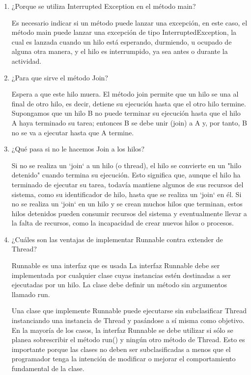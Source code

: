 \documentclass{article}
\begin{document}
\begin{enumerate}
    \item ¿Porque se utiliza Interrupted Exception en el método main?
    
    Es necesario indicar si un método puede lanzar una excepción, en este caso, el método main puede lanzar una excepción de tipo InterruptedException, la cual es lanzada cuando un hilo está esperando, durmiendo, u ocupado de alguna otra manera, y el hilo es interrumpido, ya sea antes o durante la actividad. 

    \item ¿Para que sirve el método Join?
    
    Espera a que este hilo muera. El método join permite que un hilo se una al final de otro hilo, es decir, detiene su ejecución hasta que el otro hilo termine.
    Supongamos que un hilo B no puede terminar su ejecución hasta que el hilo A haya terminado su tarea; entonces B se debe unir (join) a A y, por tanto, B no se va a ejecutar hasta que A termine.
    
    \item ¿Qué pasa si no le hacemos Join a los hilos?
    
    Si no se realiza un `join` a un hilo (o thread), el hilo se convierte en un "hilo detenido" cuando termina su ejecución. Esto significa que, aunque el hilo ha terminado de ejecutar su tarea, todavía mantiene algunos de sus recursos del sistema, como su identificador de hilo, hasta que se realiza un `join` en él. Si no se realiza un `join` en un hilo y se crean muchos hilos que terminan, estos hilos detenidos pueden consumir recursos del sistema y eventualmente llevar a la falta de recursos, como la incapacidad de crear nuevos hilos o procesos.

    \item ¿Cuáles son las ventajas de implementar Runnable contra extender de Thread?
    
    Runnable es una interfaz que es usada
    La interfaz Runnable debe ser implementada por cualquier clase cuyas instancias estén destinadas a ser ejecutadas por un hilo. La clase debe definir un método sin argumentos llamado run.
    
    Una clase que implemente Runnable puede ejecutarse sin subclasificar Thread instanciando una instancia de Thread y pasándose a sí misma como objetivo. En la mayoría de los casos, la interfaz Runnable se debe utilizar si sólo se planea sobrescribir el método run() y ningún otro método de Thread. Esto es importante porque las clases no deben ser subclasificadas a menos que el programador tenga la intención de modificar o mejorar el comportamiento fundamental de la clase.


\end{enumerate}
\end{document}
